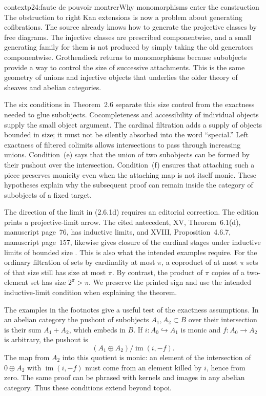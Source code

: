 \begin{dcomment}{context}{p24:faute de pouvoir montrer}{Why monomorphisms enter the construction}
The obstruction to right Kan extensions is now a problem about generating cofibrations. The source already knows how to generate the projective classes by free diagrams. The injective classes are prescribed componentwise, and a small generating family for them is not produced by simply taking the old generators componentwise. Grothendieck returns to monomorphisms because subobjects provide a way to control the size of successive attachments. This is the same geometry of unions and injective objects that underlies the older theory of sheaves and abelian categories.

The six conditions in Theorem~2.6 separate this size control from the exactness needed to glue subobjects. Cocompleteness and accessibility of individual objects supply the small object argument. The cardinal filtration adds a supply of objects bounded in size; it must not be silently absorbed into the word ``special.'' Left exactness of filtered colimits allows intersections to pass through increasing unions. Condition~(e) says that the union of two subobjects can be formed by their pushout over the intersection. Condition~(f) ensures that attaching such a piece preserves monicity even when the attaching map is not itself monic. These hypotheses explain why the subsequent proof can remain inside the category of subobjects of a fixed target.

The direction of the limit in (2.6.1d) requires an editorial correction. The edition prints a projective-limit arrow. The cited antecedent, XV, Theorem~6.1(d), manuscript page~76, has inductive limits, and XVIII, Proposition~4.6.7, manuscript page~157, likewise gives closure of the cardinal stages under inductive limits of bounded size \citep{Grothendieck1990XV,Grothendieck1990XVIII}. This is also what the intended examples require. For the ordinary filtration of sets by cardinality at most $\pi$, a coproduct of at most $\pi$ sets of that size still has size at most $\pi$. By contrast, the product of $\pi$ copies of a two-element set has size $2^\pi>\pi$. We preserve the printed sign and use the intended inductive-limit condition when explaining the theorem.

The examples in the footnotes give a useful test of the exactness assumptions. In an abelian category the pushout of subobjects $A_1,A_2\subset B$ over their intersection is their sum $A_1+A_2$, which embeds in $B$. If $i:A_0\hookrightarrow A_1$ is monic and $f:A_0\to A_2$ is arbitrary, the pushout is
\[
 (A_1\oplus A_2)/\operatorname{im}(i,-f).
\]
The map from $A_2$ into this quotient is monic: an element of the intersection of $0\oplus A_2$ with $\operatorname{im}(i,-f)$ must come from an element killed by $i$, hence from zero. The same proof can be phrased with kernels and images in any abelian category. Thus these conditions extend beyond topoi.


\end{dcomment}
